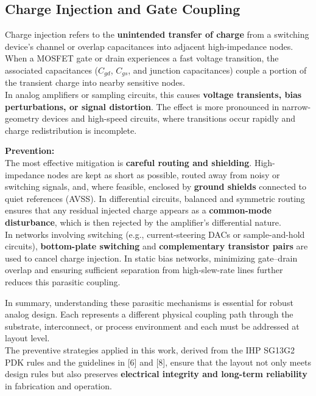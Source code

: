 \documentclass[
  11pt,
  a4paper,
  oneside]{scrbook}
\begin{document}
\subsection{Charge Injection and Gate
Coupling}\label{charge-injection-and-gate-coupling}

Charge injection refers to the \textbf{unintended transfer of charge}
from a switching device's channel or overlap capacitances into adjacent
high-impedance nodes. When a MOSFET gate or drain experiences a fast
voltage transition, the associated capacitances (\(C_{gd}\), \(C_{gs}\),
and junction capacitances) couple a portion of the transient charge into
nearby sensitive nodes.\\
In analog amplifiers or sampling circuits, this causes \textbf{voltage
transients, bias perturbations, or signal distortion}. The effect is
more pronounced in narrow-geometry devices and high-speed circuits,
where transitions occur rapidly and charge redistribution is incomplete.

\textbf{Prevention:}\\
The most effective mitigation is \textbf{careful routing and shielding}.
High-impedance nodes are kept as short as possible, routed away from
noisy or switching signals, and, where feasible, enclosed by
\textbf{ground shields} connected to quiet references (AVSS). In
differential circuits, balanced and symmetric routing ensures that any
residual injected charge appears as a \textbf{common-mode disturbance},
which is then rejected by the amplifier's differential nature.\\
In networks involving switching (e.g., current-steering DACs or
sample-and-hold circuits), \textbf{bottom-plate switching} and
\textbf{complementary transistor pairs} are used to cancel charge
injection. In static bias networks, minimizing gate--drain overlap and
ensuring sufficient separation from high-slew-rate lines further reduces
this parasitic coupling.

In summary, understanding these parasitic mechanisms is essential for
robust analog design. Each represents a different physical coupling path
through the substrate, interconnect, or process environment and each
must be addressed at layout level.\\
The preventive strategies applied in this work, derived from the IHP
SG13G2 PDK rules and the guidelines in {[}6{]} and {[}8{]}, ensure that
the layout not only meets design rules but also preserves
\textbf{electrical integrity and long-term reliability} in fabrication
and operation.
\end{document}
